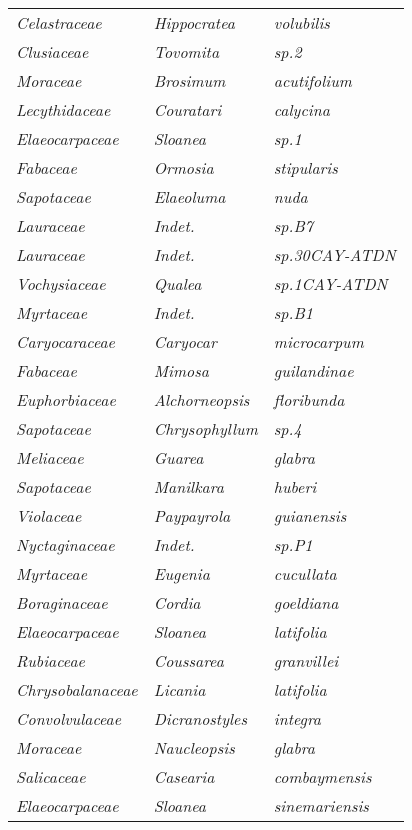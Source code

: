 \documentclass[fleqn,10pt]{ArtEcoFoG} %
\renewenvironment{table}{\begin{table*}}{\end{table*}\ignorespacesafterend}
\begin{document}
\begin{table}
\begin{tabular}[t]{lll}
\em{Celastraceae} & \em{Hippocratea} & \em{volubilis}\\
\em{Clusiaceae} & \em{Tovomita} & \em{sp.2}\\
\em{Moraceae} & \em{Brosimum} & \em{acutifolium}\\
\addlinespace
\em{Lecythidaceae} & \em{Couratari} & \em{calycina}\\
\em{Elaeocarpaceae} & \em{Sloanea} & \em{sp.1}\\
\em{Fabaceae} & \em{Ormosia} & \em{stipularis}\\
\em{Sapotaceae} & \em{Elaeoluma} & \em{nuda}\\
\em{Lauraceae} & \em{Indet.} & \em{sp.B7}\\
\addlinespace
\em{Lauraceae} & \em{Indet.} & \em{sp.30CAY-ATDN}\\
\em{Vochysiaceae} & \em{Qualea} & \em{sp.1CAY-ATDN}\\
\em{Myrtaceae} & \em{Indet.} & \em{sp.B1}\\
\em{Caryocaraceae} & \em{Caryocar} & \em{microcarpum}\\
\em{Fabaceae} & \em{Mimosa} & \em{guilandinae}\\
\addlinespace
\em{Euphorbiaceae} & \em{Alchorneopsis} & \em{floribunda}\\
\em{Sapotaceae} & \em{Chrysophyllum} & \em{sp.4}\\
\em{Meliaceae} & \em{Guarea} & \em{glabra}\\
\em{Sapotaceae} & \em{Manilkara} & \em{huberi}\\
\em{Violaceae} & \em{Paypayrola} & \em{guianensis}\\
\addlinespace
\em{Nyctaginaceae} & \em{Indet.} & \em{sp.P1}\\
\em{Myrtaceae} & \em{Eugenia} & \em{cucullata}\\
\em{Boraginaceae} & \em{Cordia} & \em{goeldiana}\\
\em{Elaeocarpaceae} & \em{Sloanea} & \em{latifolia}\\
\em{Rubiaceae} & \em{Coussarea} & \em{granvillei}\\
\addlinespace
\em{Chrysobalanaceae} & \em{Licania} & \em{latifolia}\\
\em{Convolvulaceae} & \em{Dicranostyles} & \em{integra}\\
\em{Moraceae} & \em{Naucleopsis} & \em{glabra}\\
\em{Salicaceae} & \em{Casearia} & \em{combaymensis}\\
\em{Elaeocarpaceae} & \em{Sloanea} & \em{sinemariensis}\\

\end{tabular}
\end{table}
\end{document}
